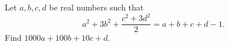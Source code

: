 Let $a,b,c,d$ be real numbers such that
\[
a^2+3b^2+\dfrac{c^2+3d^2}{2}=a+b+c+d-1 .
\]
Find $1000a+100b+10c+d$.
